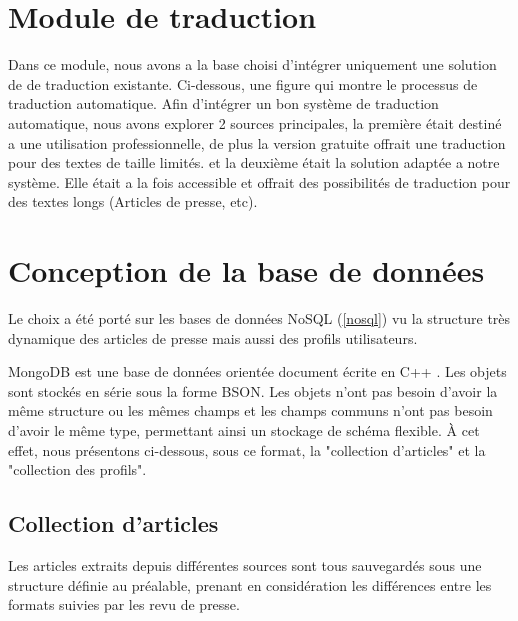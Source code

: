             
            


\section{Module de traduction}

Dans ce module, nous avons a la base choisi d'intégrer uniquement une solution de de traduction existante. Ci-dessous, une figure qui montre le processus de traduction automatique.
Afin d'intégrer un bon système de traduction automatique, nous avons explorer 2 sources principales, la première était destiné a une utilisation professionnelle, de plus la version gratuite offrait une traduction pour des textes de taille limités. et la deuxième était la solution adaptée a notre système. Elle était a la fois accessible et offrait des possibilités de traduction pour des textes longs (Articles de presse, etc). 

\section{Conception de la base de données}
Le choix a été porté sur les bases de données NoSQL (\autoref{nosql}) vu la structure très dynamique des articles de presse mais aussi des profils utilisateurs.

MongoDB est une base de données orientée document écrite en C++ \cite{NOSQL3}. Les objets sont stockés en série sous la forme BSON.
Les objets n'ont pas besoin d'avoir la même structure ou les mêmes champs et les champs communs n'ont pas besoin d'avoir le même type, permettant ainsi un stockage de schéma flexible. À cet effet, nous présentons ci-dessous, sous ce format, la "collection d'articles" et la "collection des profils".

\subsection{Collection d'articles}
Les articles extraits depuis différentes sources sont tous sauvegardés sous une structure définie au préalable, prenant en considération les différences entre les formats suivies par les revu de presse. 

